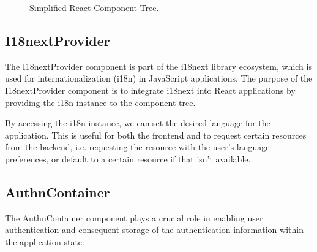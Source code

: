 \begin{figure}[H]
	\begin{center}
	\end{center}
	\caption{Simplified React Component Tree.}\label{fig:reactComponentTree}
\end{figure}

\subsection{I18nextProvider}

The I18nextProvider component is part of the i18next library ecosystem, which is used for internationalization (i18n) in JavaScript applications. The purpose of the I18nextProvider component is to integrate i18next into React applications by providing the i18n instance to the component tree.

By accessing the i18n instance, we can set the desired language for the application. This is useful for both the frontend and to request certain resources from the backend, i.e. requesting the resource with the user's language preferences, or default to a certain resource if that isn't available.


\subsection{AuthnContainer}
The AuthnContainer component plays a crucial role in enabling user authentication and consequent storage of the authentication information within the application state.

